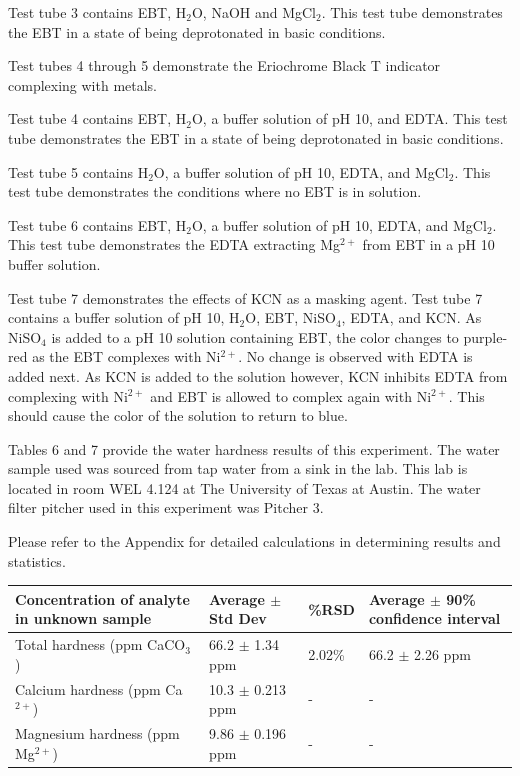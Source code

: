 \documentclass{article}
\begin{document}
Test tube 3 contains EBT, H$_2$O, NaOH and MgCl$_2$.
This test tube demonstrates the EBT in a state of being deprotonated in basic
conditions.

Test tubes 4 through 5 demonstrate the Eriochrome Black T indicator complexing
with metals.

Test tube 4 contains EBT, H$_2$O, a buffer solution of pH 10, and EDTA.
This test tube demonstrates the EBT in a state of being deprotonated in basic
conditions.

Test tube 5 contains H$_2$O, a buffer solution of pH 10, EDTA, and
MgCl$_2$.
This test tube demonstrates the conditions where no EBT is in solution.

Test tube 6 contains EBT, H$_2$O, a buffer solution of pH 10, EDTA, and
MgCl$_2$.
This test tube demonstrates the EDTA extracting Mg$^{2+}$ from EBT in a pH 10
buffer solution.

Test tube 7 demonstrates the effects of KCN as a masking agent.
Test tube 7 contains a buffer solution of pH 10, H$_2$O, EBT, NiSO$_4$, EDTA,
and KCN.
As NiSO$_4$ is added to a pH 10 solution containing EBT, the color changes to
purple-red as the EBT complexes with Ni$^{2+}$. No change is observed with EDTA
is added next. As KCN is added to the solution however, KCN inhibits EDTA from
complexing with Ni$^{2+}$ and EBT is allowed to complex again with Ni$^{2+}$.
This should cause the color of the solution to return to blue.

Tables 6 and 7 provide the water hardness results of this experiment. 
The water sample used was sourced from tap water from a sink in the lab.
This lab is located in room WEL 4.124 at The University of Texas at Austin.
The water filter pitcher used in this experiment was Pitcher 3.

Please refer to the Appendix for detailed calculations in determining results and
statistics.

\begin{center}
        \begin{tabular}{|L|L|L|L|}
                \hline
                \textbf{Concentration of analyte in unknown sample} &
                \textbf{Average \hspace{2cm}$\pm$ Std Dev} & \textbf{\%RSD} &
                \textbf{Average $\pm$ 90\% confidence interval} \\
                \hline
                Total hardness (ppm CaCO$_3$) & 66.2 $\pm$ 1.34 ppm & 2.02\% &
                66.2 $\pm$ 2.26 ppm \\
                \hline
                Calcium hardness (ppm Ca$^{2+}$) & 10.3 $\pm$ 0.213 ppm & - & -
                \\
                \hline
                Magnesium hardness \hspace{2cm} (ppm Mg$^{2+}$) & 9.86 $\pm$ 0.196 ppm & - &
                - \\
                \hline
        \end{tabular}
\end{center}
\end{document}
